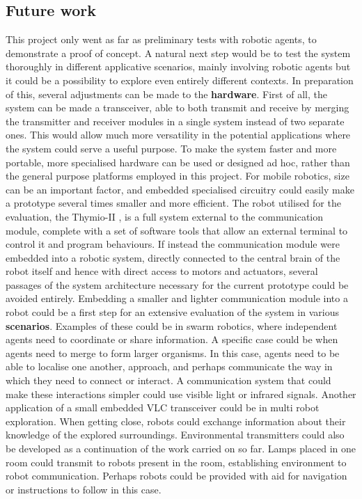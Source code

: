 \subsection{Future work}
This project only went as far as preliminary tests with robotic agents, to demonstrate a proof of concept.
A natural next step would be to test the system thoroughly in different applicative scenarios, mainly involving robotic agents but it could be a possibility to explore even entirely different contexts.
In preparation of this, several adjustments can be made to the \textbf{hardware}.
First of all, the system can be made a transceiver, able to both transmit and receive by merging the transmitter and receiver modules in a single system instead of two separate ones.
This would allow much more versatility in the potential applications where the system could serve a useful purpose.
To make the system faster and more portable, more specialised hardware can be used or designed ad hoc, rather than the general purpose platforms employed in this project.
For mobile robotics, size can be an important factor, and embedded specialised circuitry could easily make a prototype several times smaller and more efficient.
The robot utilised for the evaluation, the Thymio-II \cite{thymio}, is a full system external to the communication module, complete with a set of software tools that allow an external terminal to control it and program behaviours.
If instead the communication module were embedded into a robotic system, directly connected to the central brain of the robot itself and hence with direct access to motors and actuators, several passages of the system architecture necessary for the current prototype could be avoided entirely.
Embedding a smaller and lighter communication module into a robot could be a first step for an extensive evaluation of the system in various \textbf{scenarios}.
Examples of these could be in swarm robotics, where independent agents need to coordinate or share information.
A specific case could be when agents need to merge to form larger organisms.
In this case, agents need to be able to localise one another, approach, and perhaps communicate the way in which they need to connect or interact.
A communication system that could make these interactions simpler could use visible light or infrared signals. 
Another application of a small embedded VLC transceiver could be in multi robot exploration.
When getting close, robots could exchange information about their knowledge of the explored surroundings.
Environmental transmitters could also be developed as a continuation of the work carried on so far.
Lamps placed in one room could transmit to robots present in the room, establishing environment to robot communication.
 Perhaps robots could be provided with aid for navigation or instructions to follow in this case.